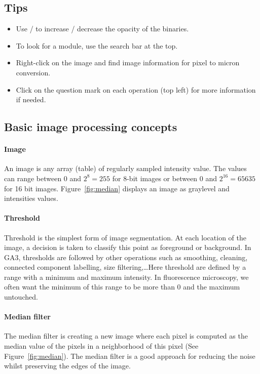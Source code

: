 \subsection{Tips}
\begin{itemize}
    \item Use \keys{\Alt+\arrowkeyup} / \keys{\Alt+\arrowkeydown}  to increase / decrease the opacity of the binaries.
    \item To look for a module, use the search bar at the top.
    \item Right-click on the image and find image information for pixel to micron conversion.
    \item Click on the question mark on each operation (top left) for more information if needed.
\end{itemize}

\subsection{Basic image processing concepts}

\paragraph{Image} An image is any array (table) of regularly sampled intensity value. The values can range between $0$ and $2^8 = 255$ for 8-bit images or between $0$ and $2^{16}=65635$ for 16 bit images. Figure~\ref{fig:median} displays an image as graylevel and intensities values.

\paragraph{Threshold} Threshold is the simplest form of image segmentation. At each location of the image, a decision is taken to classify this point as foreground or background. In GA3, thresholds are followed by other operations such as smoothing, cleaning, connected component labelling, size filtering,\dots Here threshold are defined by a range with a minimum and maximum intensity. In fluorescence microscopy, we often want the minimum of this range to be more than 0 and the maximum untouched.

\paragraph{Median filter} The median filter is creating a new image where each pixel is computed as the median value of the pixels in a neighborhood of this pixel (See Figure~\ref{fig:median}). The median filter is a good approach for reducing the noise whilst preserving the edges of the image.

